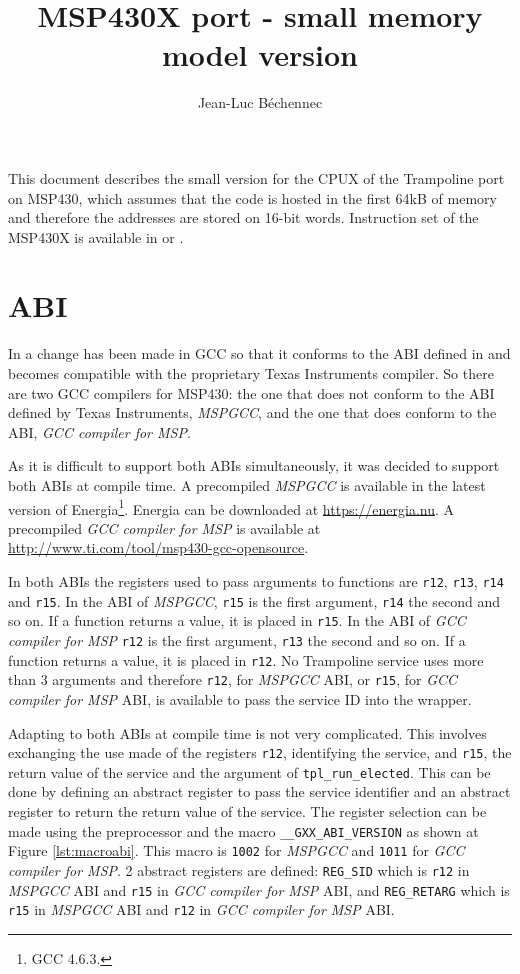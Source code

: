 \documentclass[11pt, oneside]{article}   	%
\title{MSP430X port - small memory model version}
\author{Jean-Luc Béchennec}
\begin{document}
\maketitle

This document describes the small version for the CPUX of the Trampoline port on MSP430, which assumes that the code is hosted in the first 64kB of memory and therefore the addresses are stored on 16-bit words. Instruction set of the MSP430X is available in \cite{slau208q} or \cite{slau367o}.

\section{ABI}

In \cite{slaa664} a change has been made in GCC so that it conforms to the ABI defined in \cite{slaa534} and becomes compatible with the proprietary Texas Instruments compiler. So there are two GCC compilers for MSP430: the one that does not conform to the ABI defined by Texas Instruments, \emph{MSPGCC}, and the one that does conform to the ABI, \emph{GCC compiler for MSP}. 

As it is difficult to support both ABIs simultaneously, it was decided to support both ABIs at compile time. A precompiled \emph{MSPGCC} is available in the latest version of Energia\footnote{GCC 4.6.3.}. Energia can be downloaded at {\small\url{https://energia.nu}}. A precompiled \emph{GCC compiler for MSP} is available at {\small\url{http://www.ti.com/tool/msp430-gcc-opensource}}.

In both ABIs the registers used to pass arguments to functions are \lstinline{r12}, \lstinline{r13}, \lstinline{r14} and \lstinline{r15}. In the ABI of \emph{MSPGCC}, \lstinline{r15} is the first argument, \lstinline{r14} the second and so on. If a function returns a value, it is placed in \lstinline{r15}. In the ABI of \emph{GCC compiler for MSP} \lstinline{r12} is the first argument, \lstinline{r13} the second and so on. If a function returns a value, it is placed in \lstinline{r12}.
 No Trampoline service uses more than 3 arguments and therefore \lstinline{r12}, for \emph{MSPGCC} ABI, or \lstinline{r15}, for \emph{GCC compiler for MSP} ABI, is available to pass the service ID into the wrapper.
 
Adapting to both ABIs at compile time is not very complicated. This involves exchanging the use made of the registers \lstinline{r12}, identifying the service, and \lstinline{r15}, the return value of the service and the argument of \lstinline{tpl_run_elected}. This can be done by defining an abstract register to pass the service identifier and an abstract register to return the return value of the service. The register selection can be made using the preprocessor and the macro \lstinline{__GXX_ABI_VERSION} as shown at Figure \ref{lst:macroabi}. This macro is \lstinline{1002} for \emph{MSPGCC} and \lstinline{1011} for \emph{GCC compiler for MSP}. 2 abstract registers are defined: \lstinline{REG_SID} which is \lstinline{r12} in \emph{MSPGCC} ABI and \lstinline{r15} in \emph{GCC compiler for MSP} ABI, and \lstinline{REG_RETARG} which is \lstinline{r15} in \emph{MSPGCC} ABI and \lstinline{r12}  in \emph{GCC compiler for MSP} ABI.
\end{document}
